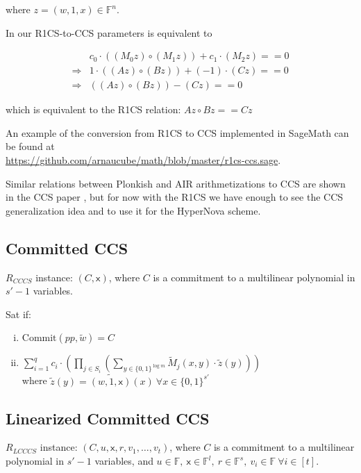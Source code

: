 \documentclass{article}
\theoremstyle{definition}
\begin{document}
where $z=(w, 1, x) \in \mathbb{F}^n$.

In our R1CS-to-CCS parameters is equivalent to

\begin{align*}
	&c_0 \cdot ( (M_0 z) \circ (M_1 z) ) + c_1 \cdot (M_2 z) ==0\\
	\Longrightarrow &1 \cdot ( (A z) \circ (B z) ) + (-1) \cdot (C z) ==0\\
	\Longrightarrow &( (A z) \circ (B z) ) - (C z) ==0
\end{align*}

which is equivalent to the R1CS relation: $Az \circ Bz == Cz$

An example of the conversion from R1CS to CCS implemented in SageMath can be found at\\
\href{https://github.com/arnaucube/math/blob/master/r1cs-ccs.sage}{https://github.com/arnaucube/math/blob/master/r1cs-ccs.sage}.

Similar relations between Plonkish and AIR arithmetizations to CCS are shown in the CCS paper \cite{cryptoeprint:2023/552}, but for now with the R1CS we have enough to see the CCS generalization idea and to use it for the HyperNova scheme.

\subsection{Committed CCS}
$R_{CCCS}$ instance: $(C, \mathsf{x})$, where $C$ is a commitment to a multilinear polynomial in $s'-1$ variables.

Sat if:
\begin{enumerate}[i.]
	\item $\text{Commit}(pp, \widetilde{w}) = C$
	\item $\sum_{i=1}^q c_i \cdot \left( \prod_{j \in S_i} \left( \sum_{y \in \{0,1\}^{\log m}} \widetilde{M}_j(x, y) \cdot \widetilde{z}(y) \right) \right)$\\
		where $\widetilde{z}(y) = \widetilde{(w, 1, \mathsf{x})}(x) ~\forall x \in \{0, 1\}^{s'}$
\end{enumerate}


\subsection{Linearized Committed CCS}
$R_{LCCCS}$ instance: $(C, u, \mathsf{x}, r, v_1, \ldots, v_t)$, where $C$ is a commitment to a multilinear polynomial in $s'-1$ variables, and $u \in \mathbb{F},~ \mathsf{x} \in \mathbb{F}^l,~ r \in \mathbb{F}^s,~ v_i \in \mathbb{F} ~\forall i \in [t]$.
\end{document}
